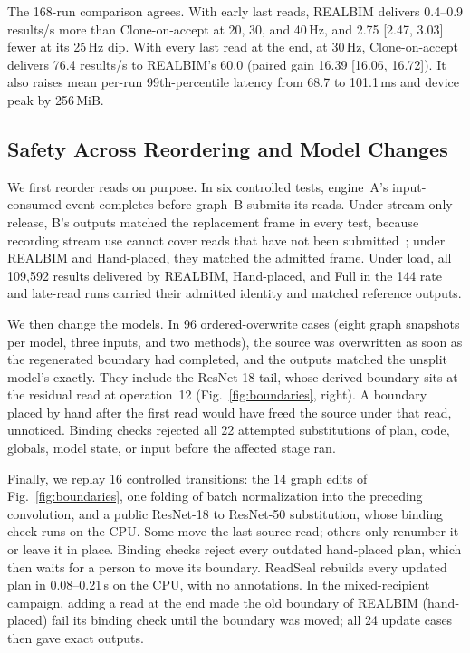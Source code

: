 \documentclass[conference]{IEEEtran}
\newcommand{\sys}{REALBIM}
\newcommand{\hps}{Hand-placed}
\newcommand{\hpr}{\sys{} (hand-placed)}
\newcommand{\MiB}{\,MiB}
\newcommand{\ms}{\,ms}
\newcommand{\Hz}{\,Hz}
\begin{document}
The 168-run comparison agrees. With early last reads, \sys{} delivers 0.4--0.9 results/s more than Clone-on-accept at 20, 30, and 40\Hz, and 2.75 [2.47, 3.03] fewer at its 25\Hz{} dip. With every last read at the end, at 30\Hz, Clone-on-accept delivers 76.4 results/s to \sys's 60.0 (paired gain 16.39 [16.06, 16.72]). It also raises mean per-run 99th-percentile latency from 68.7 to 101.1\ms{} and device peak by 256\MiB.

\subsection{Safety Across Reordering and Model Changes}
\label{sec:eval-safety}

We first reorder reads on purpose. In six controlled tests, engine~A's input-consumed event completes before graph~B submits its reads. Under stream-only release, B's outputs matched the replacement frame in every test, because recording stream use cannot cover reads that have not been submitted~\cite{recordstream}; under \sys{} and \hps, they matched the admitted frame. Under load, all 109,592 results delivered by \sys, \hps, and Full in the 144 rate and late-read runs carried their admitted identity and matched reference outputs.

We then change the models. In 96 ordered-overwrite cases (eight graph snapshots per model, three inputs, and two methods), the source was overwritten as soon as the regenerated boundary had completed, and the outputs matched the unsplit model's exactly. They include the ResNet-18 tail, whose derived boundary sits at the residual read at operation~12 (Fig.~\ref{fig:boundaries}, right). A boundary placed by hand after the first read would have freed the source under that read, unnoticed. Binding checks rejected all 22 attempted substitutions of plan, code, globals, model state, or input before the affected stage ran.

Finally, we replay 16 controlled transitions: the 14 graph edits of Fig.~\ref{fig:boundaries}, one folding of batch normalization into the preceding convolution, and a public ResNet-18 to ResNet-50 substitution, whose binding check runs on the CPU. Some move the last source read; others only renumber it or leave it in place. Binding checks reject every outdated hand-placed plan, which then waits for a person to move its boundary. ReadSeal rebuilds every updated plan in 0.08--0.21\,s on the CPU, with no annotations. In the mixed-recipient campaign, adding a read at the end made the old boundary of \hpr{} fail its binding check until the boundary was moved; all 24 update cases then gave exact outputs.
\end{document}
